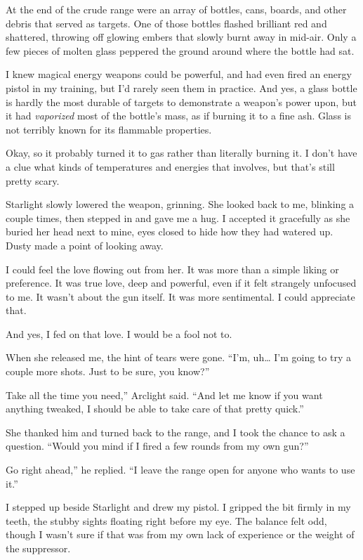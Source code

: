 At the end of the crude range were an array of bottles, cans, boards, and other debris that served as targets. One of those bottles flashed brilliant red and shattered, throwing off glowing embers that slowly burnt away in mid-air. Only a few pieces of molten glass peppered the ground around where the bottle had sat.

I knew magical energy weapons could be powerful, and had even fired an energy pistol in my training, but I’d rarely seen them in practice. And yes, a glass bottle is hardly the most durable of targets to demonstrate a weapon’s power upon, but it had \textit{vaporized} most of the bottle’s mass, as if burning it to a fine ash. Glass is not terribly known for its flammable properties.

Okay, so it probably turned it to gas rather than literally burning it. I don’t have a clue what kinds of temperatures and energies that involves, but that’s still pretty scary.

Starlight slowly lowered the weapon, grinning. She looked back to me, blinking a couple times, then stepped in and gave me a hug. I accepted it gracefully as she buried her head next to mine, eyes closed to hide how they had watered up. Dusty made a point of looking away.

I could feel the love flowing out from her. It was more than a simple liking or preference. It was true love, deep and powerful, even if it felt strangely unfocused to me. It wasn’t about the gun itself. It was more sentimental. I could appreciate that.

And yes, I fed on that love. I would be a fool not to.

When she released me, the hint of tears were gone. “I’m, uh… I’m going to try a couple more shots. Just to be sure, you know?”

\leavevmode{}Take all the time you need,” Arclight said. “And let me know if you want anything tweaked, I should be able to take care of that pretty quick.”

She thanked him and turned back to the range, and I took the chance to ask a question. “Would you mind if I fired a few rounds from my own gun?”

\leavevmode{}Go right ahead,” he replied. “I leave the range open for anyone who wants to use it.”

I stepped up beside Starlight and drew my pistol. I gripped the bit firmly in my teeth, the stubby sights floating right before my eye. The balance felt odd, though I wasn’t sure if that was from my own lack of experience or the weight of the suppressor.

